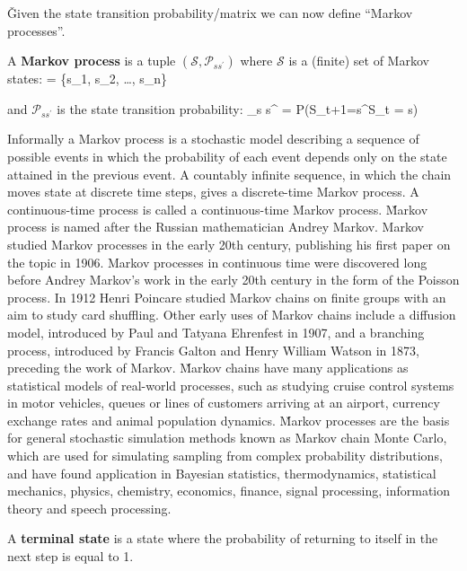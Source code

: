 \v

Given the state transition probability/matrix we can now define ``Markov processes''.

A \textbf{Markov process} is a tuple $(\mathcal{S}, \mathcal{P}_{s s^\prime})$ where $\mathcal{S}$ is a (finite) set 
of Markov states:
\bse
{} = \{s_1, s_2, \ldots, s_n\}
\ese

and $\mathcal{P}_{s s^\prime}$ is the state transition probability:
\bse
{}_{s s^\prime} = P(S_{t+1}=s^\prime \mid S_{t} = s)
\ese
\ed

Informally a Markov process is a stochastic model describing a sequence of possible events in which the probability 
of each event depends only on the state attained in the previous event. A countably infinite sequence, in which the 
chain moves state at discrete time steps, gives a discrete-time Markov process. A continuous-time process is called a
continuous-time Markov process. \v

Markov process is named after the Russian mathematician Andrey Markov. Markov studied Markov processes in the early 
20th century, publishing his first paper on the topic in 1906. Markov processes in continuous time were discovered 
long before Andrey Markov's work in the early 20th century in the form of the Poisson process. In 1912 Henri Poincare
studied Markov chains on finite groups with an aim to study card shuffling. Other early uses of Markov chains include
a diffusion model, introduced by Paul and Tatyana Ehrenfest in 1907, and a branching process, introduced by Francis 
Galton and Henry William Watson in 1873, preceding the work of Markov. \v

Markov chains have many applications as statistical models of real-world processes, such as studying cruise control 
systems in motor vehicles, queues or lines of customers arriving at an airport, currency exchange rates and animal 
population dynamics. \v

Markov processes are the basis for general stochastic simulation methods known as Markov chain Monte Carlo, which are
used for simulating sampling from complex probability distributions, and have found application in Bayesian 
statistics, thermodynamics, statistical mechanics, physics, chemistry, economics, finance, signal processing, 
information theory and speech processing.

A \textbf{terminal state} is a state where the probability of returning to itself in the next step is equal to 1.
\ed

